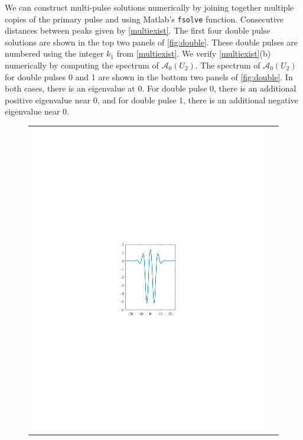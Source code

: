 \documentclass[review,onefignum,onetabnum]{siamart171218}
\newcommand{\calA}{\mathcal{A}}
\begin{document}
We can construct multi-pulse solutions numerically by joining together multiple copies of the primary pulse and using Matlab's \texttt{fsolve} function. Consecutive distances between peaks given by \cref{multiexist}. The first four double pulse solutions are shown in the top two panels of \cref{fig:double}. These double pulses are numbered using the integer $k_1$ from \cref{multiexist}. We verify \cref{multiexist}(b) numerically by computing the spectrum of $\calA_0(U_2)$. The spectrum of $\calA_0(U_2)$ for double pulses 0 and 1 are shown in the bottom two panels of \cref{fig:double}. In both cases, there is an eigenvalue at 0. For double pulse 0, there is an additional positive eigenvalue near 0, and for double pulse 1, there is an additional negative eigenvalue near 0.

\begin{figure}[ht]
\centering
\begin{tabular}{cc}
\includegraphics{double1}&

\end{tabular}
\end{figure}
\end{document}

